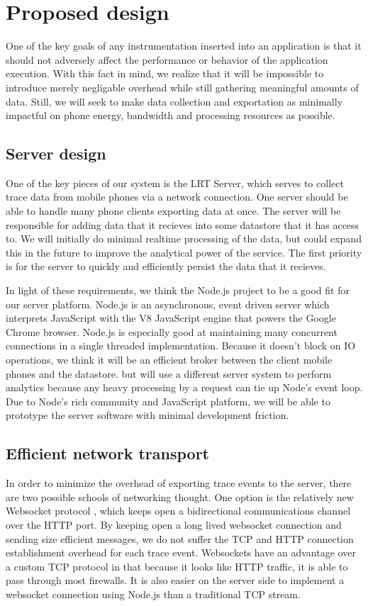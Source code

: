 \section{Proposed design}
\label{section:proposeddesign}
One of the key goals of any instrumentation inserted into an application is 
that it should not adversely affect the performance or behavior of the 
application execution. With this fact in mind, we realize that it will be 
impossible to introduce merely negligable overhead while still gathering
meaningful amounts of data. Still, we will seek to make data collection
and exportation as minimally impactful on phone energy, bandwidth and processing
resources as possible.

\subsection{Server design}
One of the key pieces of our system is the LRT Server, which serves
to collect trace data from mobile phones via a network connection.
One server should be able to handle many phone clients exporting data at once.
The server will be responsible for adding data that it recieves into
some datastore that it has access to. We will initially do minimal realtime
processing of the data, but could expand this in the future to improve the
analytical power of the service. The first priority is for the server to quickly
and efficiently persist the data that it recieves.

In light of these requirements, we think the Node.js \cite{node}
project to be a good fit for our server platform.
Node.js is an asynchronous, event driven server 
which interprets JavaScript with the V8 JavaScript engine \cite{V8-javascript} that
powers the Google Chrome browser. Node.js is especially good
at maintaining many concurrent connections in a single threaded implementation.
Because it doesn't block on IO operations, we think it will be an efficient broker
between the client mobile phones and the datastore. but will use a different server
system to perform analytics
because any heavy processing by a request can tie up Node's event loop.
Due to Node's rich community and JavaScript platform,
we will be able to prototype the server software with minimal development friction.

\subsection{Efficient network transport}
In order to minimize the overhead of exporting trace 
events to the server, there are two possible schools of networking thought.
One option is the relatively new Websocket protocol 
\cite{WebsocketRFC}, which keeps open a bidirectional communications channel 
over the HTTP port. By keeping open a long lived 
websocket connection and sending size efficient 
messages, we do not suffer the TCP and HTTP connection establishment overhead 
for each trace event. Websockets have an advantage over a custom TCP protocol
in that because it looks like HTTP traffic, it is able to pass through most
firewalls. It is also easier on the server side to implement a websocket
connection using Node.js than a traditional TCP stream.

